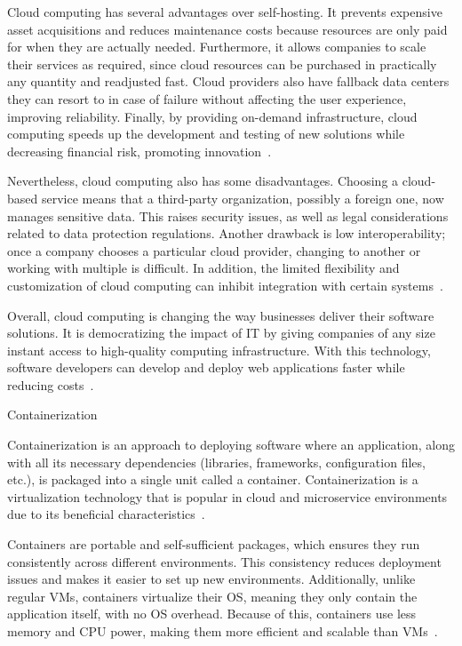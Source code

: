 \documentclass[12pt, reqno, oneside]{amsbook}
\makeatletter
\def\section{\@startsection{section}{1}%
      \z@{.5\linespacing\@plus.7\linespacing}{.25\linespacing}%
      {\normalfont\bfseries\flushleft}}
\theoremstyle{definition}
\theoremstyle{definition}
\numberwithin{section}{chapter}
\numberwithin{table}{chapter}
\numberwithin{figure}{chapter}
\makeatother
\begin{document}
Cloud computing has several advantages over self-hosting. It prevents expensive asset acquisitions and reduces maintenance costs because resources are only paid for when they are actually needed. Furthermore, it allows companies to scale their services as required, since cloud resources can be purchased in practically any quantity and readjusted fast. Cloud providers also have fallback data centers they can resort to in case of failure without affecting the user experience, improving reliability. Finally, by providing on-demand infrastructure, cloud computing speeds up the development and testing of new solutions while decreasing financial risk, promoting innovation~\cite{Figueira2024, Nordic2012, Alam2020, Nadeem2024, Villamizar2016}.

Nevertheless, cloud computing also has some disadvantages. Choosing a cloud-based service means that a third-party organization, possibly a foreign one, now manages sensitive data. This raises security issues, as well as legal considerations related to data protection regulations. Another drawback is low interoperability; once a company chooses a particular cloud provider, changing to another or working with multiple is difficult. In addition, the limited flexibility and customization of cloud computing can inhibit integration with certain systems~\cite{Nordic2012, Alam2020}.

Overall, cloud computing is changing the way businesses deliver their software solutions. It is democratizing the impact of \ac{IT} by giving companies of any size instant access to high-quality computing infrastructure. With this technology, software developers can develop and deploy web applications faster while reducing costs~\cite{Figueira2024, Berry2021, Nadeem2024}.

\section{Containerization}

Containerization is an approach to deploying software where an application, along with all its necessary dependencies (libraries, frameworks, configuration files, etc.), is packaged into a single unit called a container. Containerization is a virtualization technology that is popular in cloud and microservice environments due to its beneficial characteristics~\cite{Figueira2024, Hardikar2021, Potdar2020}.

Containers are portable and self-sufficient packages, which ensures they run consistently across different environments. This consistency reduces deployment issues and makes it easier to set up new environments. Additionally, unlike regular \acp{VM}, containers virtualize their \ac{OS}, meaning they only contain the application itself, with no \ac{OS} overhead. Because of this, containers use less memory and \ac{CPU} power, making them more efficient and scalable than \acp{VM}~\cite{Figueira2024, Hardikar2021, Potdar2020}.
\end{document}
